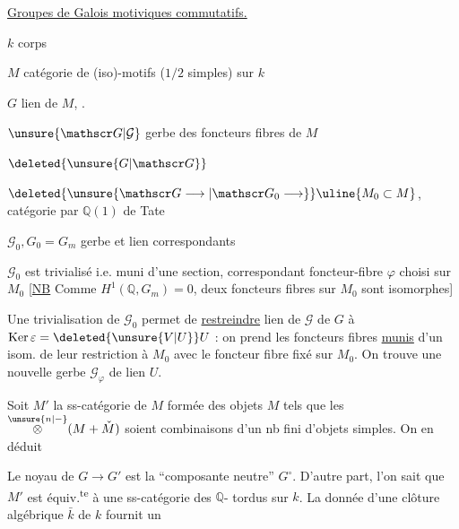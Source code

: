 \uline{Groupes de Galois motiviques commutatifs.}

$k$ corps

$M$ catégorie de (iso)-motifs ($1/2$ simples) sur $k$

$G$ lien de $M$, .

$\unsure{\mathscr G|\mathcal G}$ gerbe des  foncteurs fibres de $M$

$\deleted{\unsure{G|\mathscr G}}$

$\deleted{\unsure{\mathscr G\longrightarrow|\mathscr G_0\longrightarrow}}\uline{M_0\subset M}$, catégorie   par $\mathbb Q(1)$ de Tate

$\mathscr G_0,G_0=G_m$ gerbe et lien correspondants


$\mathscr G_0$ est trivialisé i.e. muni d'une
section, correspondant   foncteur-fibre $\varphi$  choisi sur $M_0$
[\uline{NB} Comme $H^1(\mathbb Q,G_m)=0$, deux foncteurs
fibres sur $M_0$ sont  isomorphes]

Une trivialisation de $\mathscr G_0$ permet de \uline{restreindre} 
lien de $\mathscr G$ de $G$ à $\operatorname{Ker}\varepsilon=\deleted{\unsure{V|U}}U$ : on prend les
foncteurs fibres \uline{munis} d'un isom. de leur
restriction à $M_0$ avec le foncteur fibre fixé
sur $M_0$. On trouve une nouvelle gerbe
$\mathscr G_{\varphi}$ de lien $U$.

Soit $M'$ la ss-catégorie de $M$ formée des objets
$M$ tels que les $\overset{\unsure{n|-}}{\otimes}(M+\check M)$ soient combinaisons d'un
nb fini  d'objets simples.  On en déduit

Le noyau de $G\to G'$ est
la ``composante neutre'' $G^\circ$.
D'autre part, l'on sait que
$M'$ est équiv.\textsuperscript{te} à une ss-catégorie  des $\mathbb Q$- tordus sur $k$. La donnée
d'une clôture algébrique $\bar k$ de $k$ fournit un
